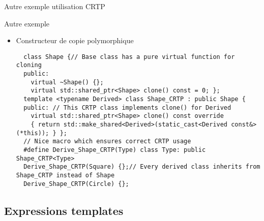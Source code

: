 \documentclass[compress,10pt,aspectratio=169]{beamer}
\begin{document}
\begin{frame}[fragile]{Autre exemple utilisation CRTP}
  \scriptsize
  \begin{exampleblock}{\small Autre exemple}
  \begin{itemize}
  \item Constructeur de copie polymorphique
  \begin{verbatim}
  class Shape {// Base class has a pure virtual function for cloning 
  public: 
    virtual ~Shape() {}; 
    virtual std::shared_ptr<Shape> clone() const = 0; }; 
  template <typename Derived> class Shape_CRTP : public Shape { 
  public: // This CRTP class implements clone() for Derived 
    virtual std::shared_ptr<Shape> clone() const override 
    { return std::make_shared<Derived>(static_cast<Derived const&>(*this)); } }; 
  // Nice macro which ensures correct CRTP usage 
  #define Derive_Shape_CRTP(Type) class Type: public Shape_CRTP<Type> 
  Derive_Shape_CRTP(Square) {};// Every derived class inherits from Shape_CRTP instead of Shape
  Derive_Shape_CRTP(Circle) {};
  \end{verbatim}
  \end{itemize}
  \end{exampleblock}
  \end{frame}
  

\subsection{Expressions templates}
\end{document}
